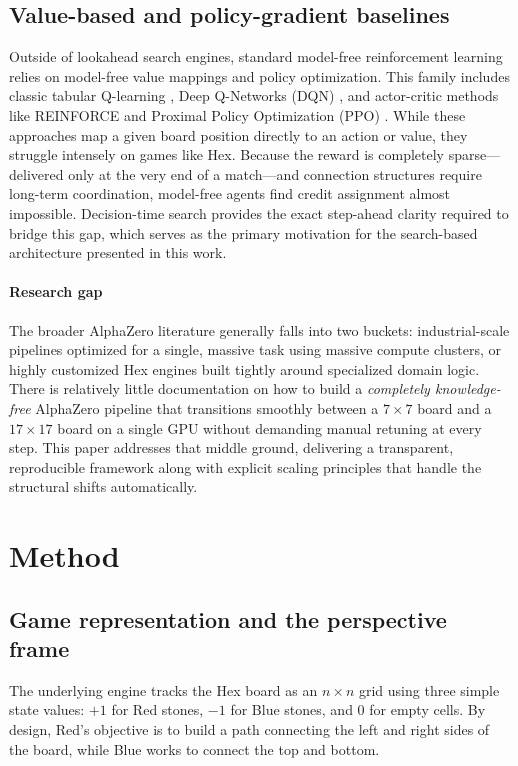 \documentclass[conference]{IEEEtran}
\begin{document}
\subsection{Value-based and policy-gradient baselines}
Outside of lookahead search engines, standard model-free reinforcement learning relies on model-free value mappings and policy optimization. This family includes classic tabular Q-learning \cite{watkins1992qlearning}, Deep Q-Networks (DQN) \cite{mnih2015human}, and actor-critic methods like REINFORCE \cite{williams1992simple} and Proximal Policy Optimization (PPO) \cite{schulman2017proximal}. While these approaches map a given board position directly to an action or value, they struggle intensely on games like Hex. Because the reward is completely sparse---delivered only at the very end of a match---and connection structures require long-term coordination, model-free agents find credit assignment almost impossible. Decision-time search provides the exact step-ahead clarity required to bridge this gap, which serves as the primary motivation for the search-based architecture presented in this work.

\paragraph{Research gap} The broader AlphaZero literature generally falls into two buckets: industrial-scale pipelines optimized for a single, massive task using massive compute clusters, or highly customized Hex engines built tightly around specialized domain logic. There is relatively little documentation on how to build a \emph{completely knowledge-free} AlphaZero pipeline that transitions smoothly between a $7\times7$ board and a $17\times17$ board on a single GPU without demanding manual retuning at every step. This paper addresses that middle ground, delivering a transparent, reproducible framework along with explicit scaling principles that handle the structural shifts automatically.

\section{Method}
\label{sec:method}

\subsection{Game representation and the perspective frame}
The underlying engine tracks the Hex board as an $n\times n$ grid using three simple state values: $+1$ for Red stones, $-1$ for Blue stones, and $0$ for empty cells. By design, Red's objective is to build a path connecting the left and right sides of the board, while Blue works to connect the top and bottom.
\end{document}
